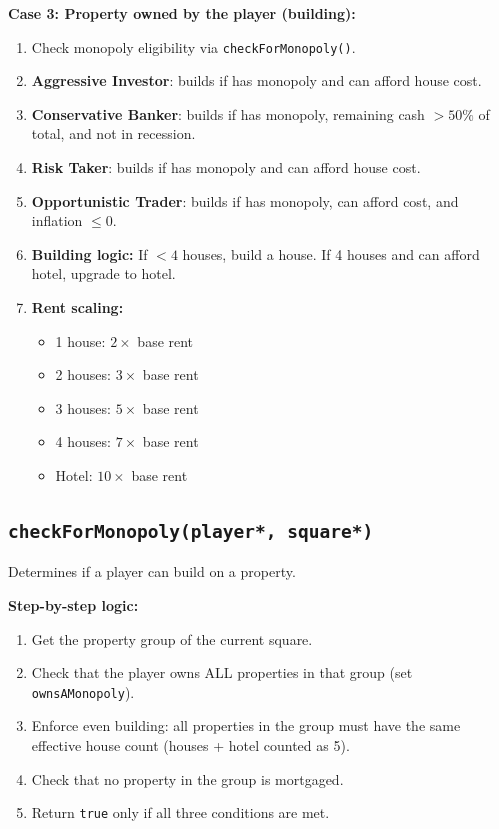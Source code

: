 \documentclass[12pt,a4paper]{article}
\begin{document}
\textbf{Case 3: Property owned by the player (building):}
\begin{enumerate}[noitemsep]
    \item Check monopoly eligibility via \texttt{checkForMonopoly()}.
    \item \textbf{Aggressive Investor}: builds if has monopoly and can afford house cost.
    \item \textbf{Conservative Banker}: builds if has monopoly, remaining cash $> 50\%$ of total, and not in recession.
    \item \textbf{Risk Taker}: builds if has monopoly and can afford house cost.
    \item \textbf{Opportunistic Trader}: builds if has monopoly, can afford cost, and inflation $\leq 0$.
    \item \textbf{Building logic:} If $<4$ houses, build a house. If 4 houses and can afford hotel, upgrade to hotel.
    \item \textbf{Rent scaling:}
    \begin{itemize}[noitemsep]
        \item 1 house: $2\times$ base rent
        \item 2 houses: $3\times$ base rent
        \item 3 houses: $5\times$ base rent
        \item 4 houses: $7\times$ base rent
        \item Hotel: $10\times$ base rent
    \end{itemize}
\end{enumerate}

\subsection{\texttt{checkForMonopoly(player*, square*)}}
Determines if a player can build on a property.

\textbf{Step-by-step logic:}
\begin{enumerate}[noitemsep]
    \item Get the property group of the current square.
    \item Check that the player owns ALL properties in that group (set \texttt{ownsAMonopoly}).
    \item Enforce even building: all properties in the group must have the same effective house count (houses + hotel counted as 5).
    \item Check that no property in the group is mortgaged.
    \item Return \texttt{true} only if all three conditions are met.
\end{enumerate}
\end{document}
